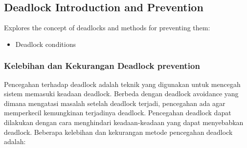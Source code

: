 \documentclass[12pt]{article}
\begin{document}
\subsection{Deadlock Introduction and Prevention}
Explores the concept of deadlocks and methods for preventing them:
\begin{itemize}
    \item Deadlock conditions
\end{itemize}
\subsubsection{Kelebihan dan Kekurangan Deadlock prevention}

\hspace{1cm} Pencegahan terhadap deadlock adalah teknik yang digunakan untuk mencegah sistem memasuki keadaan deadlock.
Berbeda dengan deadlock avoidance yang dimana mengatasi masalah setelah deadlock terjadi, pencegahan ada agar memperkecil
kemungkinan terjadinya deadlock. Pencegahan deadlock dapat dilakukan dengan cara menghindari keadaan-keadaan yang dapat menyebabkan deadlock.
Beberapa kelebihan dan kekurangan metode pencegahan deadlock adalah:
\end{document}
